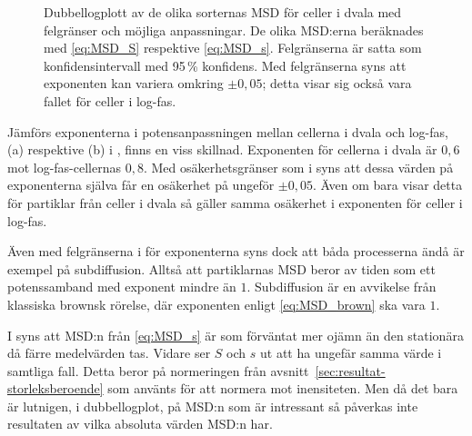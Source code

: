 \begin{figure}\centerline{
\subfigure[][]{

}
\subfigure[][]{

}}
\caption{Dubbellogplott av de olika sorternas MSD för celler i dvala med felgränser och möjliga anpassningar. De olika MSD:erna beräknades med \eqref{eq:MSD_S} respektive \eqref{eq:MSD_s}. Felgränserna är satta som konfidensintervall med 95\,\% konfidens. Med felgränserna syns att exponenten kan variera omkring $\pm 0,05$; detta visar sig också vara fallet för celler i log-fas.}
\label{fig:MSD_error}
\end{figure}

Jämförs exponenterna i potensanpassningen mellan cellerna i dvala och log-fas, (a) respektive (b) i , finns en viss skillnad. Exponenten för cellerna i dvala är $0,6$ mot log-fas-cellernas $0,8$. Med osäkerhetsgränser som i  syns att dessa värden på exponenterna själva får en osäkerhet på ungeför $\pm 0,05$. Även om  bara visar detta för partiklar från celler i dvala så gäller samma osäkerhet i exponenten för celler i log-fas.

Även med felgränserna i  för exponenterna syns dock att båda processerna ändå är exempel på subdiffusion. Alltså att partiklarnas MSD beror av tiden som ett potenssamband med exponent mindre än $1$. Subdiffusion är en avvikelse från klassiska brownsk rörelse, där exponenten enligt \eqref{eq:MSD_brown} ska vara $1$. 


I  syns att MSD:n från \eqref{eq:MSD_s} är som förväntat mer ojämn än den stationära då färre medelvärden tas. Vidare ser $S$ och $s$ ut att ha ungefär samma värde i samtliga fall. Detta beror på normeringen från avsnitt~\ref{sec:resultat-storleksberoende} som använts för att normera mot inensiteten. Men då det bara är lutnigen, i dubbellogplot, på MSD:n som är intressant så påverkas inte resultaten av vilka absoluta värden MSD:n har.






